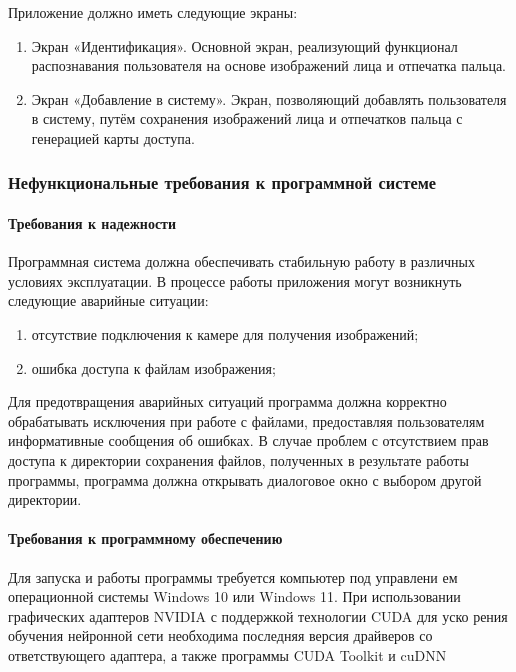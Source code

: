  Приложение должно иметь следующие экраны:
 
 \begin{enumerate}
 	\item Экран «Идентификация». Основной экран, реализующий
 	функционал распознавания пользователя на основе изображений лица и отпечатка пальца.
 	\item Экран «Добавление в систему». Экран, позволяющий добавлять пользователя в систему, путём сохранения изображений лица и отпечатков пальца с генерацией карты доступа.
 \end{enumerate}


\subsubsection{Нефункциональные требования к программной системе}

\paragraph {Требования к надежности}

Программная система должна обеспечивать стабильную работу в различных условиях эксплуатации. В процессе работы приложения могут возникнуть следующие аварийные ситуации:
\begin{enumerate}
	\item отсутствие подключения к камере для получения изображений;
	\item ошибка доступа к файлам изображения;
\end{enumerate}

Для предотвращения аварийных ситуаций программа должна корректно обрабатывать исключения при работе с файлами, предоставляя пользователям информативные сообщения об ошибках. В случае проблем с отсутствием прав доступа к директории сохранения файлов, полученных в результате работы программы, программа должна открывать диалоговое окно с выбором другой директории.

\paragraph {Требования к программному обеспечению}

Для запуска и работы программы требуется компьютер под управлени
ем операционной системы Windows 10 или Windows 11. При использовании
графических адаптеров NVIDIA с поддержкой технологии CUDA для уско
рения обучения нейронной сети необходима последняя версия драйверов со
ответствующего адаптера, а также программы CUDA Toolkit и cuDNN

